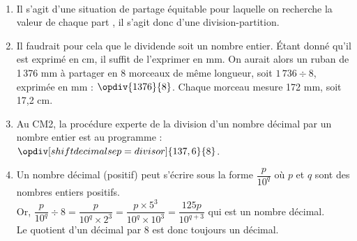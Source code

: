 \begin{corrige}
\ \\ [-5mm]
\begin{enumerate}
   \item Il s'agit d'une situation de partage équitable pour laquelle on recherche \og la valeur de chaque part \fg, il s'agit donc d'une division-partition.
   \item Il faudrait pour cela que le dividende soit un nombre entier. Étant donné qu'il est exprimé en cm, il suffit de l'exprimer en mm. On aurait alors un ruban de 1\,376 mm à partager en 8 morceaux de même longueur, soit $1\,736\div8$, exprimée en mm : $\opdiv{1376}{8}$. \quad Chaque morceau mesure 172 mm, soit 17,2 cm.
   \item Au CM2, la procédure experte de la division d'un nombre décimal par un nombre entier est au programme :
   $\opdiv[shiftdecimalsep=divisor]{137,6}{8}$.
   \item Un nombre décimal (positif) peut s'écrire sous la forme $\dfrac{p}{10^q}$ où $p$ et $q$ sont des nombres entiers positifs. \\
   Or, $\dfrac{p}{10^q}\div8 =\dfrac{p}{10^q\times2^3} =\dfrac{p\times5^3}{10^{q}\times10^3} =\dfrac{125p}{10^{q+3}}$ qui est un nombre décimal. \\ [1mm]
   Le quotient d'un décimal par 8 est donc toujours un décimal.
\end{enumerate}
\end{corrige}

\bigskip


